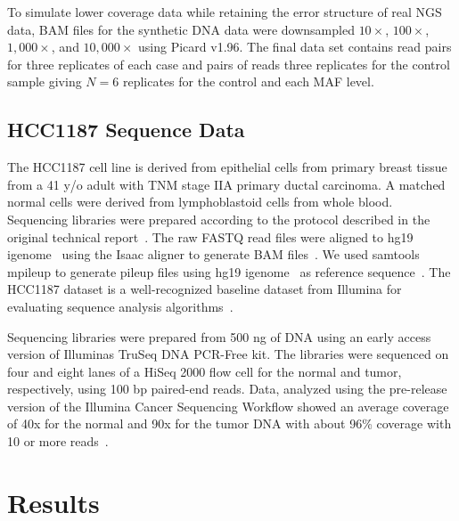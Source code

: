 \documentclass[11pt,reqno]{amsart}
\begin{document}
To simulate lower coverage data while retaining the error structure of real NGS data, BAM files for the synthetic DNA data were downsampled $10\times$, $100\times$, $1,000\times$, and $10,000\times$ using Picard v1.96. The final data set contains read pairs for three replicates of each case and pairs of reads three replicates for the control sample giving $N=6$ replicates for the control and each MAF level.

\subsection{HCC1187 Sequence Data}

The HCC1187 cell line is derived from  epithelial cells from primary breast tissue from a 41 y/o adult with TNM stage IIA primary ductal carcinoma. A matched normal cells were derived from lymphoblastoid cells from whole blood. Sequencing libraries were prepared according to the protocol described in the original technical report~\cite{}. The raw FASTQ read files were aligned to hg19 igenome~\cite{} using the Isaac aligner to generate BAM files~\citep{raczy2013isaac}. We used samtools mpileup to generate pileup files using hg19 igenome~\cite{} as reference sequence~\citep{Navin:2010gu}. The HCC1187 dataset is a well-recognized baseline dataset from Illumina for evaluating sequence analysis algorithms~\citep{newman2013relative,howarth2011large,howarth2007array}.

Sequencing libraries were prepared from 500 ng of DNA using an early access version of Illuminas TruSeq DNA PCR-Free kit. The libraries were sequenced on four and eight lanes of a HiSeq 2000 flow cell for the normal and tumor, respectively, using 100 bp paired-end reads. Data, analyzed using the pre-release version of the Illumina Cancer Sequencing Workflow showed an average coverage of 40x for the normal and 90x for the tumor DNA with about 96\% coverage with 10 or more reads~\cite{}.


\section{Results}
\end{document}
